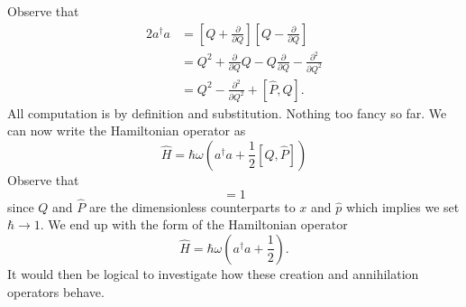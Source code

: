 Observe that
\begin{subequations}
\begin{align}
2a^{\dag}a &= \left[Q+\frac{\partial}{\partial
    Q}\right]\left[Q-\frac{\partial}{\partial Q}\right]\\
&= Q^2 + \frac{\partial}{\partial Q} Q -
Q\frac{\partial}{\partial Q} - \frac{\partial^{2}}{\partial
  Q^{2}}\\
&= Q^{2}-\frac{\partial^2}{\partial Q^2} + [\widehat{P},Q].
\end{align}
\end{subequations}
All computation is by definition and substitution. Nothing too
fancy so far. We can now write the Hamiltonian operator as
\begin{equation}%
\widehat{H} = \hbar\omega\left(a^{\dag}a+\frac{1}{2}[Q,\widehat{P}]\right)
\end{equation}
Observe that
\begin{equation}%
[Q,\widehat{P}] = 1
\end{equation}
since $Q$ and $\widehat{P}$ are the dimensionless counterparts to
$x$ and $\widehat{p}$ which implies we set $\hbar\to1$. We
end up with the form of the Hamiltonian operator
\begin{equation}%
\widehat{H} = \hbar\omega\left(a^{\dag}a+\frac{1}{2}\right).
\end{equation}
It would then be logical to investigate how these creation and
annihilation operators behave.
